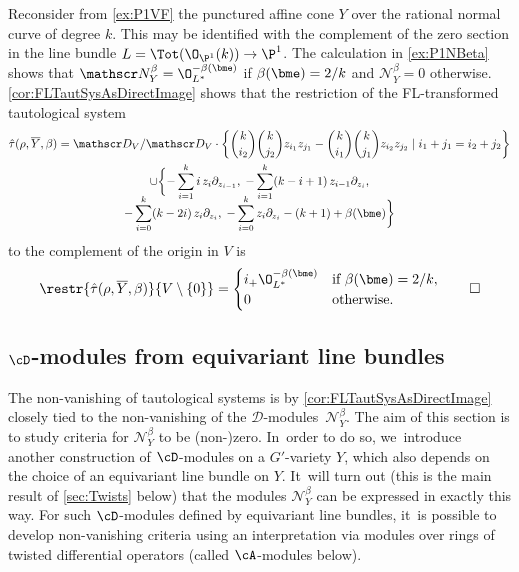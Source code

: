 \begin{exa}
Reconsider from \cref{ex:P1VF} the punctured affine cone $Y$ over the rational normal curve of degree $k$. This may be identified with the complement of the zero section in the line bundle $L = \Tot(\O_{\P^1}(k)) \to \P^1$. The calculation in \cref{ex:P1NBeta} shows that $\mathscr N_Y^\beta = \O_{L^*}^{-\beta(\bme)}$ if $\beta(\bme) = 2/k$ and $\mathscr N_Y^\beta = 0$ otherwise. \cref{cor:FLTautSysAsDirectImage} shows that the restriction of the FL-transformed tautological system
\begin{multline*}
\hat \tau(\rho,\overline Y, \beta) = \mathscr D_V / \mathscr D_V \cdot \left\{\binom{k}{i_2} \binom{k}{j_2} z_{i_1} z_{j_1}- \binom{k}{i_1} \binom{k}{j_1} z_{i_2} z_{j_2} \mid i_1+j_1=i_2+j_2\right\} \\
\cup \biggl\{-\sum_{i=1}^k i \, z_i \partial_{z_{i-1}}, \; -\sum_{i=1}^k (k-i+1) \, z_{i-1} \partial_{z_i},\\[-8pt]
 -\sum_{i=0}^k (k-2i) \, z_i \partial_{z_i}, \; -\sum_{i=0}^k z_i \partial_{z_i}-(k+1)+\beta(\bme)\biggr\}
\end{multline*}
to the complement of the origin in $V$ is
\[
\restr{\hat \tau(\rho,\overline Y,\beta)}{V\setminus \{0\}} =
\begin{cases}
i_+ \O_{L^*}^{-\beta(\bme)} &\text{if } \beta(\bme) = 2/k, \\
0 &\text{otherwise}.
\end{cases}\qedhere
\]
\end{exa}

\subsection{\texorpdfstring{$\cD$}{D}-modules from equivariant line bundles} \label{ssec:DFromAMod}

The non-vanishing of tautological systems is by \cref{cor:FLTautSysAsDirectImage} closely tied to the non-vanishing of the $\mathscr{D}$\nobreakdash-mod\-ules~$\mathscr{N}_Y^\beta$. The aim of this section is to study criteria for $\mathscr N_Y^\beta$ to be (non-)zero. In~order to do so, we~introduce another construction of $\cD$\nobreakdash-mod\-ules on a $G'$-variety $Y$, which also depends on the choice of an equivariant line bundle on $Y$. It~will turn out (this is the main result of \cref{sec:Twists} below) that the modules $\mathscr N_Y^\beta$ can be expressed in exactly this way.
For such $\cD$\nobreakdash-mod\-ules defined by equivariant line bundles, it~is possible to develop non-vanishing criteria using an interpretation via modules over rings of twisted differential operators (called $\cA$\nobreakdash-mod\-ules below).

